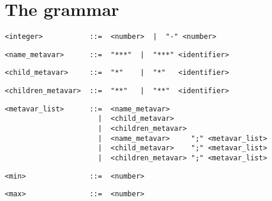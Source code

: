 \section{The grammar}

\begin{small}\begin{verbatim}
<integer>           ::=  <number>  |  "-" <number>
\end{verbatim}\end{small}

\begin{small}\begin{verbatim}
<name_metavar>      ::=  "***"  |  "***" <identifier>
\end{verbatim}\end{small}

\begin{small}\begin{verbatim}
<child_metavar>     ::=  "*"    |  "*"   <identifier>
\end{verbatim}\end{small}

\begin{small}\begin{verbatim}
<children_metavar>  ::=  "**"   |  "**"  <identifier>
\end{verbatim}\end{small}

\begin{small}\begin{verbatim}
<metavar_list>      ::=  <name_metavar>
                      |  <child_metavar>
                      |  <children_metavar>
                      |  <name_metavar>     ";" <metavar_list>
                      |  <child_metavar>    ";" <metavar_list>
                      |  <children_metavar> ";" <metavar_list>
\end{verbatim}\end{small}

\begin{small}\begin{verbatim}
<min>               ::=  <number>
\end{verbatim}\end{small}

\begin{small}\begin{verbatim}
<max>               ::=  <number>
\end{verbatim}\end{small}

